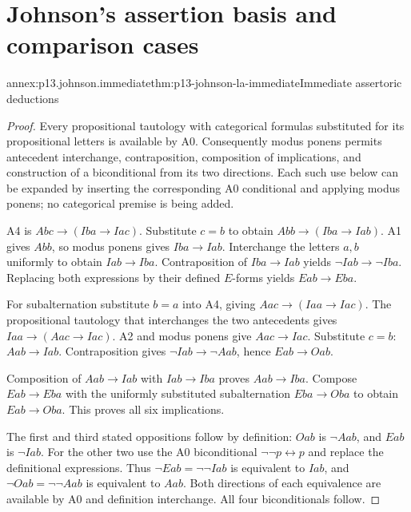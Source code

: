 \section{Johnson's assertion basis and comparison cases}
\label{sec:p13-johnson-annex}

\begin{annexitem}{annex:p13.johnson.immediate}{thm:p13-johnson-la-immediate}{Immediate assertoric deductions}
\begin{proof}
Every propositional tautology with categorical formulas substituted for its
propositional letters is available by A0. Consequently modus ponens
permits antecedent interchange, contraposition, composition of implications,
and construction of a biconditional from its two directions. Each such
use below can be expanded by inserting the corresponding A0 conditional
and applying modus ponens; no categorical premise is being added.

A4 is \(Abc\to(Iba\to Iac)\). Substitute \(c=b\) to obtain
\(Abb\to(Iba\to Iab)\). A1 gives \(Abb\), so modus ponens gives
\(Iba\to Iab\). Interchange the letters \(a,b\) uniformly to obtain
\(Iab\to Iba\). Contraposition of \(Iba\to Iab\) yields
\(\neg Iab\to\neg Iba\). Replacing both expressions by their
defined \(E\)-forms yields \(Eab\to Eba\).

For subalternation substitute \(b=a\) into A4, giving
\(Aac\to(Iaa\to Iac)\). The propositional tautology that interchanges
the two antecedents gives \(Iaa\to(Aac\to Iac)\).
A2 and modus ponens give \(Aac\to Iac\). Substitute \(c=b\):
\(Aab\to Iab\). Contraposition gives
\(\neg Iab\to\neg Aab\), hence \(Eab\to Oab\).

Composition of \(Aab\to Iab\) with \(Iab\to Iba\) proves
\(Aab\to Iba\). Compose \(Eab\to Eba\) with the uniformly
substituted subalternation \(Eba\to Oba\) to obtain \(Eab\to Oba\).
This proves all six implications.

The first and third stated oppositions follow by definition:
\(Oab\) is \(\neg Aab\), and \(Eab\) is \(\neg Iab\).
For the other two use the A0 biconditional
\(\neg\neg p\leftrightarrow p\) and replace the definitional
expressions. Thus \(\neg Eab=\neg\neg Iab\) is equivalent to
\(Iab\), and \(\neg Oab=\neg\neg Aab\) is equivalent to \(Aab\).
Both directions of each equivalence are available by A0 and
definition interchange. All four biconditionals follow.
\end{proof}
\end{annexitem}

